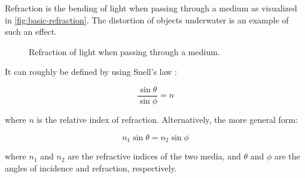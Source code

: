Refraction is the bending of light when passing through a medium as visualized in \autoref{fig:basic-refraction}. The distortion of objects underwater is an example of such an effect.

\begin{figure}[H]
  \centering
  \caption{Refraction of light when passing through a medium.}
  \label{fig:basic-refraction}
\end{figure}

It can roughly be defined by using Snell's law \cite{fowles1989introduction}:

\begin{equation}
  \label{eqn:snells-law}
  \frac{\sin \theta}{\sin \phi} = n
\end{equation}

where $n$ is the relative index of refraction. Alternatively, the more general form:

\begin{equation}
  \label{eqn:snells-law-general}
  n_1 \sin \theta = n_2 \sin \phi
\end{equation}

where $n_1$ and $n_2$ are the refractive indices of the two media, and $\theta$ and $\phi$ are the angles of incidence and refraction, respectively.

